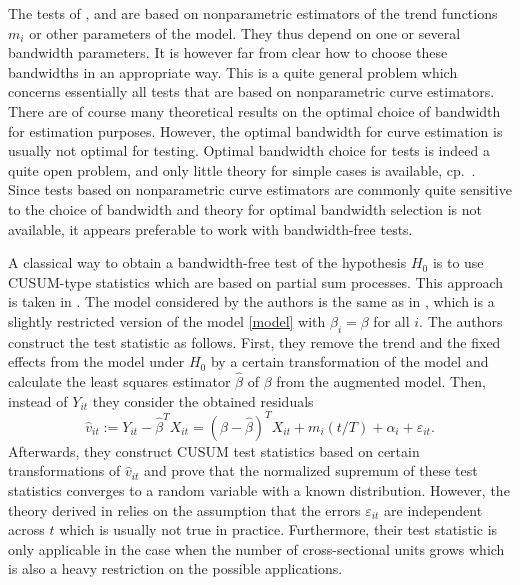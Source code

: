 \documentclass[a4paper,12pt]{article}
\begin{document}
The tests of \cite{Zhang2012}, \cite{DegrasWu2012} and \cite{ChenWu2018} are based on nonparametric estimators of the trend functions $m_i$ or other parameters of the model. They thus depend on one or several bandwidth parameters. It is however far from clear how to choose these bandwidths in an appropriate way. This is a quite general problem which concerns essentially all tests that are based on nonparametric curve estimators. There are of course many theoretical results on the optimal choice of bandwidth for estimation purposes. However, the optimal bandwidth for curve estimation is usually not optimal for testing. Optimal bandwidth choice for tests is indeed a quite open problem, and only little theory for simple cases is available, cp.\ \cite{GaoGijbels2008}. Since tests based on nonparametric curve estimators are commonly quite sensitive to the choice of bandwidth and theory for optimal bandwidth selection is not available, it appears preferable to work with bandwidth-free tests. 


A classical way to obtain a bandwidth-free test of the hypothesis $H_0$ is to use CUSUM-type statistics which are based on partial sum processes. This approach is taken in \cite{Hidalgo2014}. The model considered by the authors is the same as in \cite{Zhang2012}, which is a slightly restricted version of the model \eqref{model} with $\beta_i = \beta$ for all $i$. The authors construct the test statistic as follows. First, they remove the trend and the fixed effects from the model under $H_0$ by a certain transformation of the model and calculate the least squares estimator $\widehat{\beta}$ of $\beta$ from the augmented model. Then, instead of $Y_{it}$ they consider the obtained residuals 
\[\widehat{v}_{it}:= Y_{it} - \widehat{\beta}^T X_{it} = (\beta - \widehat{\beta})^T X_{it} + m_i(t/T) + \alpha_i + \varepsilon_{it}.\]
Afterwards, they construct CUSUM test statistics based on certain transformations of $\widehat{v}_{it}$ and prove that the normalized supremum of these test statistics converges to a random variable with a known distribution. However, the theory derived in \cite{Hidalgo2014} relies on the assumption that the errors $\varepsilon_{it}$ are independent across $t$ which is usually not true in practice. Furthermore, their test statistic is only applicable in the case when the number of cross-sectional units grows which is also a heavy restriction on the possible applications.
\end{document}
